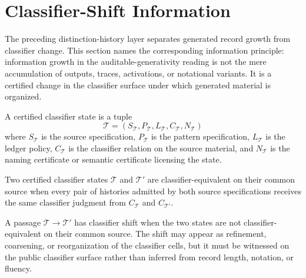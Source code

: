 \section{Classifier-Shift Information}
\label{sec:visions-philosophy-classifier-shift-information}

The preceding distinction-history layer separates generated record growth
from classifier change. This section names the corresponding information
principle: information growth in the auditable-generativity reading is not
the mere accumulation of outputs, traces, activations, or notational
variants. It is a certified change in the classifier surface under which
generated material is organized.

\begin{definition}
\label{def:philosophy-certified-classifier-state}
A certified classifier state is a tuple
$$
\mathcal{T}=(S_{\mathcal{T}},P_{\mathcal{T}},L_{\mathcal{T}},
C_{\mathcal{T}},N_{\mathcal{T}})
$$
where $S_{\mathcal{T}}$ is the source specification, $P_{\mathcal{T}}$
is the pattern specification, $L_{\mathcal{T}}$ is the ledger policy,
$C_{\mathcal{T}}$ is the classifier relation on the source material, and
$N_{\mathcal{T}}$ is the naming certificate or semantic certificate
licensing the state.
\end{definition}

\begin{definition}
\label{def:philosophy-classifier-equivalence}
Two certified classifier states $\mathcal{T}$ and $\mathcal{T}'$ are
classifier-equivalent on their common source when every pair of histories
admitted by both source specifications receives the same classifier
judgment from $C_{\mathcal{T}}$ and $C_{\mathcal{T}'}$.
\end{definition}

\begin{definition}
\label{def:philosophy-classifier-state-shift}
A passage $\mathcal{T}\to\mathcal{T}'$ has classifier shift when the
two states are not classifier-equivalent on their common source. The
shift may appear as refinement, coarsening, or reorganization of the
classifier cells, but it must be witnessed on the public classifier
surface rather than inferred from record length, notation, or fluency.
\end{definition}

